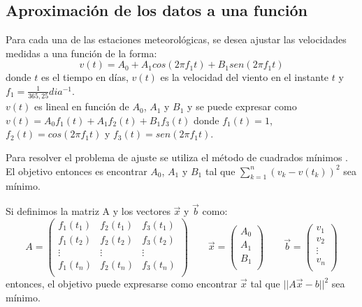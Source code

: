 \documentclass[journal, monochrome]{IEEEtran}
\begin{document}
\subsection{Aproximación de los datos a una función}
\par
Para cada una de las estaciones meteorológicas, se desea ajustar las velocidades medidas a una función de la forma:
\begin{equation}
v(t) = A_{0} + A_{1}cos(2\pi f_{1}t) + B_{1}sen(2\pi f_{1}t)
\label{equation:model}
\end{equation}
donde $t$ es el tiempo en días, $v(t)$ es la velocidad del viento en el instante $t$ y $f_{1} = \frac{1}{365,25} dia^{-1}$. \\
$v(t)$ es lineal en función de $A_{0}$, $A_{1}$ y $B_{1}$ y se puede expresar como $v(t) = A_{0}f_{1}(t) + A_{1}f_{2}(t) + B_{1}f_{3}(t)$ donde $f_{1}(t) = 1$, $f_{2}(t) = cos(2\pi f_{1}t)$ y $f_{3}(t) = sen(2\pi f_{1}t)$.
\par
Para resolver el problema de ajuste se utiliza el método de cuadrados mínimos \citep{mathews}. El objetivo entonces es encontrar $A_{0}$, $A_{1}$ y $B_{1}$ tal que 
$\sum_{k=1}^{n} (v_{k} - v(t_{k}))^{2} $ sea mínimo.
\par
Si definimos la matriz A y los vectores $\vec{x}$ y $\vec{b}$ como:
\begin{equation}
A = \left(\begin{array}{ccc}
f_{1}(t_{1}) & f_{2}(t_{1}) & f_{3}(t_{1}) \\
f_{1}(t_{2}) & f_{2}(t_{2}) & f_{3}(t_{2}) \\
\vdots & \vdots & \vdots \\
f_{1}(t_{n}) & f_{2}(t_{n}) & f_{3}(t_{n}) \\
\end{array} \right) \qquad
\vec{x} = \left(\begin{array}{c}
A_{0} \\
A_{1} \\
B_{1} \\
\end{array} \right) \qquad
\vec{b} = \left(\begin{array}{c}
v_{1} \\
v_{2} \\
\vdots \\
v_{n} \\
\end{array} \right)
\end{equation}
entonces, el objetivo puede expresarse como encontrar $\vec{x}$ tal que $||A\vec{x} - {b}||^{2}$ sea mínimo.
\end{document}
